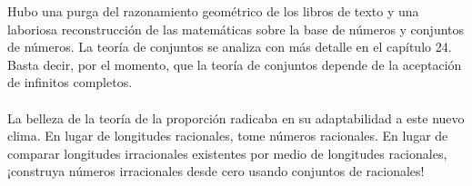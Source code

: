 \documentclass{book}
\begin{document}
    Hubo una purga del razonamiento geométrico de los libros de texto y una laboriosa reconstrucción 
    de las matemáticas sobre la base de números y conjuntos de números. La teoría de conjuntos 
    se analiza con más detalle en el capítulo 24. Basta decir, por el momento, que la teoría de 
    conjuntos depende de la aceptación de infinitos completos.
    \\ \\ 
    La belleza de la teoría de la proporción radicaba en su adaptabilidad a este nuevo clima. 
    En lugar de longitudes racionales, tome números racionales. En lugar de comparar longitudes 
    irracionales existentes por medio de longitudes racionales,
    ¡construya números irracionales desde cero usando conjuntos de racionales!

    \section{}
    
\end{document}
